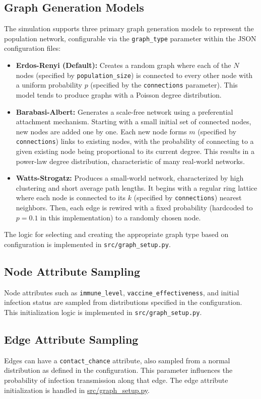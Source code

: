 \documentclass[12pt]{article}
\begin{document}
\subsection{Graph Generation Models}
The simulation supports three primary graph generation models to represent the population network, configurable via the \texttt{graph\_type} parameter within the JSON configuration files:
\begin{itemize}
    \item \textbf{Erdos-Renyi (Default):} Creates a random graph where each of the $N$ nodes (specified by \texttt{population\_size}) is connected to every other node with a uniform probability $p$ (specified by the \texttt{connections} parameter). This model tends to produce graphs with a Poisson degree distribution.
    \item \textbf{Barabasi-Albert:} Generates a scale-free network using a preferential attachment mechanism. Starting with a small initial set of connected nodes, new nodes are added one by one. Each new node forms $m$ (specified by \texttt{connections}) links to existing nodes, with the probability of connecting to a given existing node being proportional to its current degree. This results in a power-law degree distribution, characteristic of many real-world networks.
    \item \textbf{Watts-Strogatz:} Produces a small-world network, characterized by high clustering and short average path lengths. It begins with a regular ring lattice where each node is connected to its $k$ (specified by \texttt{connections}) nearest neighbors. Then, each edge is rewired with a fixed probability (hardcoded to $p=0.1$ in this implementation) to a randomly chosen node.
\end{itemize}

The logic for selecting and creating the appropriate graph type based on configuration is implemented in \texttt{src/graph\_setup.py}.

\subsection{Node Attribute Sampling}
Node attributes such as \texttt{immune\_level}, \texttt{vaccine\_ef\-fec\-tive\-ness}, and initial infection status are sampled from distributions specified in the configuration. This initialization logic is implemented in \texttt{src/graph\_setup.py}.

\subsection{Edge Attribute Sampling}
Edges can have a \texttt{contact\_chance} attribute, also sampled from a normal distribution as defined in the configuration. This parameter influences the probability of infection transmission along that edge. The edge attribute initialization is handled in \url{src/graph_setup.py}.
\end{document}
